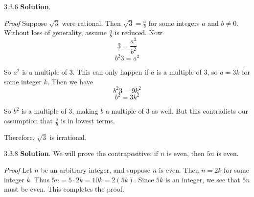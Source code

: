 \documentclass[11pt,]{book}
\makeatletter
\theoremstyle{ptxplainnotitle}
\theoremstyle{ptxplaintitle}
\renewcommand*{\proofname}{Proof}
\renewenvironment{proof}[1][\proofname]{\par
  \pushQED{\qed}%
  \normalfont \topsep6\p@\@plus6\p@\relax
  \trivlist
  \item\relax
    {\itshape
    #1\@addpunct{.}}\hspace\labelsep\ignorespaces
}{%
  \popQED\endtrivlist\@endpefalse
}
\theoremstyle{ptxdefinitionnotitle}
\theoremstyle{ptxdefinitiontitle}
\theoremstyle{ptxdefinitionnotitle}
\theoremstyle{ptxdefinitiontitle}
\theoremstyle{ptxdefinitionnotitle}
\theoremstyle{ptxdefinitiontitle}
\theoremstyle{ptxdefinitiontitlenonumber}
\theoremstyle{ptxdefinitiontitlenonumber}
\numberwithin{equation}{chapter}
\makeatother
\begin{document}
\begin{divisionexercise}{3.3.6}
\textbf{Solution}.\quad%
\begin{proof}\hypertarget{proof-33}{}
\hypertarget{p-2494}{}%
Suppose \(\sqrt{3}\) were rational. Then \(\sqrt{3} = \frac{a}{b}\) for some integers \(a\) and \(b \ne 0\). Without loss of generality, assume \(\frac{a}{b}\) is reduced. Now%
\begin{equation*}
3 = \frac{a^2}{b^2}
\end{equation*}
%
\begin{equation*}
b^2 3 = a^2
\end{equation*}
%
\par
\hypertarget{p-2495}{}%
So \(a^2\) is a multiple of 3. This can only happen if \(a\) is a multiple of 3, so \(a = 3k\) for some integer \(k\). Then we have%
\begin{equation*}
b^2 3 = 9k^2
\end{equation*}
%
\begin{equation*}
b^2 = 3k^2
\end{equation*}
%
\par
\hypertarget{p-2496}{}%
So \(b^2\) is a multiple of 3, making \(b\) a multiple of 3 as well. But this contradicts our assumption that \(\frac{a}{b}\) is in lowest terms.%
\par
\hypertarget{p-2497}{}%
Therefore, \(\sqrt{3}\) is irrational.%
\end{proof}
\end{divisionexercise}%
\begin{divisionexercise}{3.3.8}
\textbf{Solution}.\quad%
\hypertarget{p-2502}{}%
We will prove the contrapositive: if \(n\) is even, then \(5n\) is even.%
\begin{proof}\hypertarget{proof-34}{}
\hypertarget{p-2503}{}%
Let \(n\) be an arbitrary integer, and suppose \(n\) is even. Then \(n = 2k\) for some integer \(k\). Thus \(5n = 5\cdot 2k = 10k = 2(5k)\). Since \(5k\) is an integer, we see that \(5n\) must be even. This completes the proof.%
\end{proof}
\end{divisionexercise}%
\end{document}
